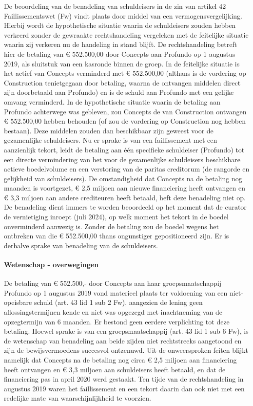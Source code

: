 \documentclass[
  dutch,
  a4paper,
]{article}
\begin{document}
De beoordeling van de benadeling van schuldeisers in de zin van artikel 42 Faillissementswet (Fw) vindt plaats door middel van een vermogensvergelijking. Hierbij wordt de hypothetische situatie waarin de schuldeisers zouden hebben verkeerd zonder de gewraakte rechtshandeling vergeleken met de feitelijke situatie waarin zij verkeren nu de handeling in stand blijft. De rechtshandeling betreft hier de betaling van € 552.500,00 door Concepts aan Profundo op 1 augustus 2019, als sluitstuk van een kasronde binnen de groep. In de feitelijke situatie is het actief van Concepts verminderd met € 552.500,00 (althans is de vordering op Construction tenietgegaan door betaling, waarna de ontvangen middelen direct zijn doorbetaald aan Profundo) en is de schuld aan Profundo met een gelijke omvang verminderd. In de hypothetische situatie waarin de betaling aan Profundo achterwege was gebleven, zou Concepts de van Construction ontvangen € 552.500,00 hebben behouden (of zou de vordering op Construction nog hebben bestaan). Deze middelen zouden dan beschikbaar zijn geweest voor de gezamenlijke schuldeisers. Nu er sprake is van een faillissement met een aanzienlijk tekort, leidt de betaling aan één specifieke schuldeiser (Profundo) tot een directe vermindering van het voor de gezamenlijke schuldeisers beschikbare actieve boedelvolume en een verstoring van de paritas creditorum (de rangorde en gelijkheid van schuldeisers). De omstandigheid dat Concepts na de betaling nog maanden is voortgezet, € 2,5 miljoen aan nieuwe financiering heeft ontvangen en € 3,3 miljoen aan andere crediteuren heeft betaald, heft deze benadeling niet op. De benadeling dient immers te worden beoordeeld op het moment dat de curator de vernietiging inroept (juli 2024), op welk moment het tekort in de boedel onverminderd aanwezig is. Zonder de betaling zou de boedel wegens het ontbreken van die € 552.500,00 thans ongunstiger gepositioneerd zijn. Er is derhalve sprake van benadeling van de schuldeisers.

\paragraph{Wetenschap - overwegingen}\label{wetenschap---overwegingen-44}

De betaling van € 552.500,- door Concepts aan haar groepsmaatschappij Profundo op 1 augustus 2019 vond materieel plaats ter voldoening van een niet-opeisbare schuld (art. 43 lid 1 sub 2 Fw), aangezien de lening geen aflossingstermijnen kende en niet was opgezegd met inachtneming van de opzegtermijn van 6 maanden. Er bestond geen eerdere verplichting tot deze betaling. Hoewel sprake is van een groepsmaatschappij (art. 43 lid 1 sub 6 Fw), is de wetenschap van benadeling aan beide zijden niet rechtstreeks aangetoond en zijn de bewijsvermoedens succesvol ontzenuwd. Uit de onweersproken feiten blijkt namelijk dat Concepts na de betaling nog circa € 2,5 miljoen aan financiering heeft ontvangen en € 3,3 miljoen aan schuldeisers heeft betaald, en dat de financiering pas in april 2020 werd gestaakt. Ten tijde van de rechtshandeling in augustus 2019 waren het faillissement en een tekort daarin dan ook niet met een redelijke mate van waarschijnlijkheid te voorzien.
\end{document}

